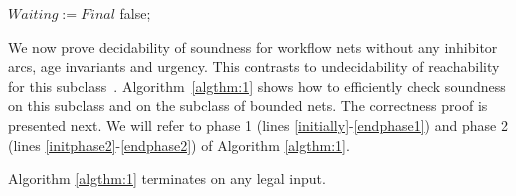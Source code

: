 \begin{algorithm}[th!]
{{{{{}
}
}
}
$\mathit{Waiting}:= \mathit{Final}$\; \label{endphase1}
{\Return false;\label{endphase2}} 
}
\end{algorithm}

We now prove decidability of soundness for workflow nets without 
any inhibitor arcs, age invariants and urgency. This contrasts to
undecidability of reachability 
for this subclass~\cite{RGE:reachability}. 
Algorithm~\ref{algthm:1} shows how to efficiently check soundness
on this subclass and on the subclass of bounded nets.
The correctness proof is presented next. We will refer 
to phase 1 (lines \ref{initially}-\ref{endphase1}) 
and phase 2 (lines \ref{initphase2}-\ref{endphase2}) of Algorithm \ref{algthm:1}.

\begin{lemma}[Termination]
	\label{algthm:1:termination}
	Algorithm \ref{algthm:1} terminates on any legal input.
\end{lemma}

